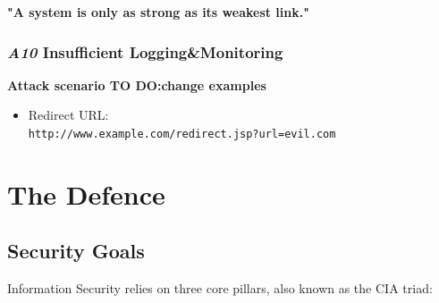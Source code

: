\documentclass[a5paper,pagesize,10pt,bibtotoc,DIV=10,twoside]{scrbook}
\begin{document}
\begin{displayquote}
\textbf{"A system is only as strong as its weakest link."}\\

\end{displayquote}

\subsection{\textit{A10}  \normalsize{Insufficient Logging\&Monitoring}}


\vspace{2mm}
\textbf{Attack scenario \textbf{TO DO:}change examples}
\begin{itemize}
\item Redirect URL:\\
\small{\verb|http://www.example.com/redirect.jsp?url=evil.com|}
\end{itemize}



\chapter{The Defence}

\section{Security Goals}

Information Security relies on three core pillars, also known as the CIA triad: 
\end{document}
